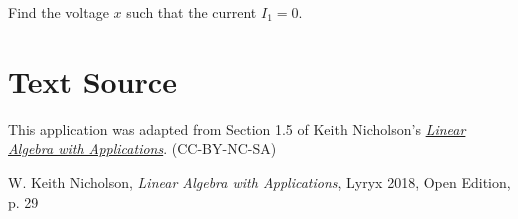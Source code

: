 \documentclass{ximera}
\begin{document}
\begin{problem}

Find the voltage $x$ such that the current $I_1 = 0$.

%
\end{problem}

\section*{Text Source} This application was adapted from Section 1.5 of Keith Nicholson's \href{https://open.umn.edu/opentextbooks/textbooks/linear-algebra-with-applications}{\it Linear Algebra with Applications}. (CC-BY-NC-SA)

W. Keith Nicholson, {\it Linear Algebra with Applications}, Lyryx 2018, Open Edition, p. 29 




\end{document}
